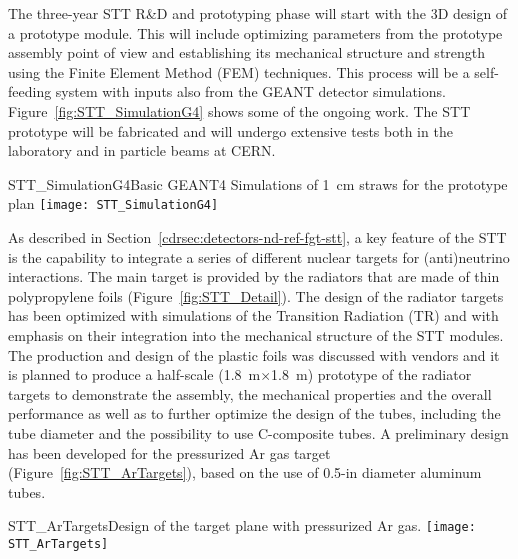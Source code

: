 The three-year STT R\&D and prototyping phase will start with the 3D
design of a prototype module.  This will include optimizing
parameters from the prototype assembly point of view and
establishing its mechanical structure and strength using the Finite Element Method (FEM) 
techniques. This process will be a self-feeding system with inputs
also from the GEANT detector simulations.
Figure~\ref{fig:STT_SimulationG4} shows some of the ongoing work. 
The STT prototype will be fabricated and  will undergo %
extensive tests both in the laboratory and %
in particle
beams at CERN.

\begin{cdrfigure}
{STT_SimulationG4}{Basic GEANT4 Simulations of 1~cm straws for the prototype plan}
\texttt{[image: STT\_SimulationG4]}
\end{cdrfigure}


As described in Section~\ref{cdrsec:detectors-nd-ref-fgt-stt}, a key
feature of the STT is the capability to integrate a series of
different nuclear targets for (anti)neutrino interactions.  The main
target is provided by the radiators that are made of thin polypropylene foils
(Figure~\ref{fig:STT_Detail}).  The design of the radiator targets has
been optimized with simulations of the Transition Radiation (TR) and
with emphasis on their integration into the mechanical structure of
the STT modules.  The production and design of the plastic foils was
discussed with vendors and %
it is planned to produce a half-scale
(1.8~m$\times$1.8~m) prototype of the radiator targets to demonstrate
the assembly, the mechanical properties and the overall
performance as well as to
further optimize the design of the tubes, including the tube diameter
and the possibility to use C-composite tubes. 
A preliminary design has been developed for the
pressurized Ar gas target (Figure~\ref{fig:STT_ArTargets}), based on
the use of 0.5-in diameter aluminum tubes.
\begin{cdrfigure}
{STT_ArTargets}{Design of the target plane with pressurized Ar gas.}
\texttt{[image: STT\_ArTargets]}
\end{cdrfigure}

